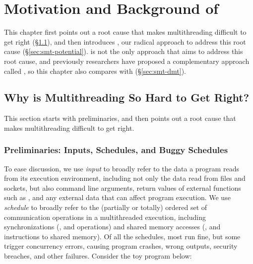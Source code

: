 \chapter{Motivation and Background of \smt}
\label{sec:smt-motivation}

This chapter first points out a root cause that makes multithreading
difficult to get right (\S\ref{sec:smt-why}), and then introduces 
\smt, our radical approach to address this root cause 
(\S\ref{sec:smt-potential}). \smt is not the only approach that aims to address 
this root cause, and previously researchers have proposed a 
complementary approach called \dmt, so this 
chapter also compares \smt with \dmt (\S\ref{sec:smt-dmt}).

\section{Why is Multithreading So Hard to Get Right?}
\label{sec:smt-why}



This section starts with preliminaries, and then points out a root cause that
makes multithreading difficult to get right.

\subsection{Preliminaries: Inputs, Schedules, and Buggy Schedules}

To ease discussion, we use \emph{input} to broadly refer to the data a
program reads from its execution environment, including not only the data
read from files and sockets, but also command line arguments, return
values of external functions such as , and any external data
that can affect program execution.  We use \emph{schedule} to broadly refer to
the (partially or totally) ordered set of communication operations in a
multithreaded execution, including synchronizations (\eg,  and
 operations) and shared memory accesses (\eg,  and
 instructions to shared memory). Of all the schedules, most run
fine, but some trigger concurrency errors, causing program crashes,
wrong outputs, security breaches, and other failures. Consider the toy program
below:

\hspace{2in}
\begin{minipage}{0.5\columnwidth}
\end{minipage}
\vspace{0.2in}

